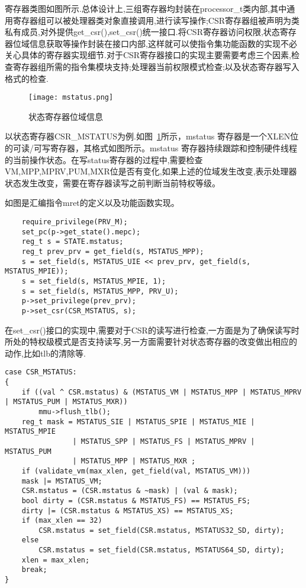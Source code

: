 寄存器类图如图所示.总体设计上,三组寄存器均封装在processor\_t类内部,其中通用寄存器组可以被处理器类对象直接调用,进行读写操作;CSR寄存器组被声明为类私有成员,对外提供get\_csr(),set\_csr()统一接口.将CSR寄存器访问权限,状态寄存器位域信息获取等操作封装在接口内部,这样就可以使指令集功能函数的实现不必关心具体的寄存器实现细节.对于CSR寄存器接口的实现主要需要考虑三个因素,检查寄存器组所需的指令集模块支持;处理器当前权限模式检查;以及状态寄存器写入格式的检查.
\begin{figure}[h]
    \centering
    \texttt{[image: mstatus.png]}
    \caption{状态寄存器位域信息}
    \label{fig:mstatus}
\end{figure}

以状态寄存器CSR\_MSTATUS为例.如图~\ref{fig:mstatus}所示，mstatus 寄存器是一个XLEN位的可读/可写寄存器，其格式如图所示。mstatus 寄存器持续跟踪和控制硬件线程的当前操作状态。在写status寄存器的过程中,需要检查VM,MPP,MPRV,PUM,MXR位是否有变化,如果上述的位域发生改变,表示处理器状态发生改变，需要在寄存器读写之前判断当前特权等级。


如图是汇编指令mret的定义以及功能函数实现。
\begin{lstlisting}
    require_privilege(PRV_M);
    set_pc(p->get_state().mepc);
    reg_t s = STATE.mstatus;
    reg_t prev_prv = get_field(s, MSTATUS_MPP);
    s = set_field(s, MSTATUS_UIE << prev_prv, get_field(s, MSTATUS_MPIE));
    s = set_field(s, MSTATUS_MPIE, 1);
    s = set_field(s, MSTATUS_MPP, PRV_U);
    p->set_privilege(prev_prv);
    p->set_csr(CSR_MSTATUS, s);
\end{lstlisting}

在set\_csr()接口的实现中,需要对于CSR的读写进行检查,一方面是为了确保读写时所处的特权级模式是否支持读写,另一方面需要针对状态寄存器的改变做出相应的动作,比如tlb的清除等.
\begin{lstlisting}
case CSR_MSTATUS:
{
    if ((val ^ CSR.mstatus) & (MSTATUS_VM | MSTATUS_MPP | MSTATUS_MPRV | MSTATUS_PUM | MSTATUS_MXR))
        mmu->flush_tlb();
    reg_t mask = MSTATUS_SIE | MSTATUS_SPIE | MSTATUS_MIE | MSTATUS_MPIE
                | MSTATUS_SPP | MSTATUS_FS | MSTATUS_MPRV | MSTATUS_PUM
                | MSTATUS_MPP | MSTATUS_MXR ;
    if (validate_vm(max_xlen, get_field(val, MSTATUS_VM)))
    mask |= MSTATUS_VM;
    CSR.mstatus = (CSR.mstatus & ~mask) | (val & mask);
    bool dirty = (CSR.mstatus & MSTATUS_FS) == MSTATUS_FS;
    dirty |= (CSR.mstatus & MSTATUS_XS) == MSTATUS_XS;
    if (max_xlen == 32)
        CSR.mstatus = set_field(CSR.mstatus, MSTATUS32_SD, dirty);
    else
        CSR.mstatus = set_field(CSR.mstatus, MSTATUS64_SD, dirty);
    xlen = max_xlen;
    break;
}
\end{lstlisting}

